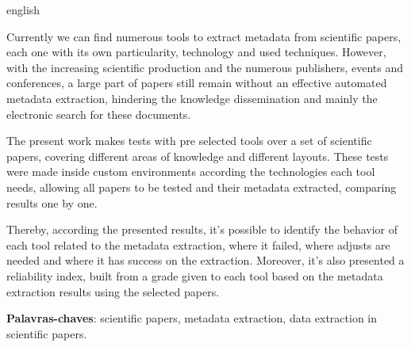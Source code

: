 \begin{resumo}[Abstract]
\begin{otherlanguage*}{english}

Currently we can find numerous tools to extract metadata from scientific papers, each one with its own particularity, technology and used techniques. However, with the increasing scientific production and the numerous publishers, events and conferences, a large part of papers still remain without an effective automated metadata extraction, hindering the knowledge dissemination and mainly the electronic search for these documents. 

The present work makes tests with pre selected tools over a set of scientific papers, covering different areas of knowledge and different layouts. These tests were made inside custom environments according the technologies each tool needs, allowing all papers to be tested and their metadata extracted, comparing results one by one. 

Thereby, according the presented results, it's possible to identify the behavior of each tool related to the metadata extraction, where it failed, where adjusts are needed and where it has success on the extraction. Moreover, it's also presented a reliability index, built from a grade given to each tool based on the metadata extraction results using the selected papers.

\textbf{Palavras-chaves}: scientific papers, metadata extraction, data extraction in scientific papers.


\end{otherlanguage*}
\end{resumo}

 

  
